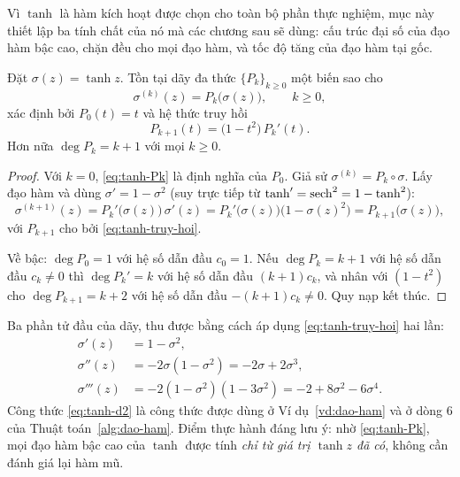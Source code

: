 Vì $\tanh$ là hàm kích hoạt được chọn cho toàn bộ phần thực nghiệm, mục này
thiết lập ba tính chất của nó mà các chương sau sẽ dùng: cấu trúc đại số của đạo
hàm bậc cao, chặn đều cho mọi đạo hàm, và tốc độ tăng của đạo hàm tại gốc.
 
\begin{bode}
\label{bd:tanh-dao-ham}
Đặt $\sigma(z) = \tanh z$. Tồn tại dãy đa thức $\{P_k\}_{k\ge 0}$ một biến sao
cho
\begin{equation}
\sigma^{(k)}(z) = P_k\big(\sigma(z)\big), \qquad k \ge 0,
\label{eq:tanh-Pk}
\end{equation}
xác định bởi $P_0(t) = t$ và hệ thức truy hồi
\begin{equation}
P_{k+1}(t) = \big(1 - t^2\big)\, P_k'(t).
\label{eq:tanh-truy-hoi}
\end{equation}
Hơn nữa $\deg P_k = k+1$ với mọi $k \ge 0$.
\end{bode}
 
\begin{proof}
Với $k = 0$, \eqref{eq:tanh-Pk} là định nghĩa của $P_0$. Giả sử
$\sigma^{(k)} = P_k \circ \sigma$. Lấy đạo hàm và dùng
$\sigma' = 1 - \sigma^2$ (suy trực tiếp từ
$\tanh' = \operatorname{sech}^2 = 1 - \tanh^2$):
\[
\sigma^{(k+1)}(z) = P_k'\big(\sigma(z)\big)\,\sigma'(z)
 = P_k'\big(\sigma(z)\big)\big(1 - \sigma(z)^2\big)
 = P_{k+1}\big(\sigma(z)\big),
\]
với $P_{k+1}$ cho bởi \eqref{eq:tanh-truy-hoi}.
 
Về bậc: $\deg P_0 = 1$ với hệ số dẫn đầu $c_0 = 1$. Nếu $\deg P_k = k+1$ với hệ
số dẫn đầu $c_k \ne 0$ thì $\deg P_k' = k$ với hệ số dẫn đầu $(k+1)c_k$, và nhân
với $(1-t^2)$ cho $\deg P_{k+1} = k+2$ với hệ số dẫn đầu $-(k+1)c_k \ne 0$. Quy
nạp kết thúc.
\end{proof}
 
Ba phần tử đầu của dãy, thu được bằng cách áp dụng
\eqref{eq:tanh-truy-hoi} hai lần:
\begin{align}
\sigma'(z)   &= 1 - \sigma^{2}, \label{eq:tanh-d1}\\
\sigma''(z)  &= -2\sigma\left(1-\sigma^{2}\right)
             = -2\sigma + 2\sigma^3, \label{eq:tanh-d2}\\
\sigma'''(z) &= -2\left(1-\sigma^{2}\right)\left(1-3\sigma^{2}\right)
             = -2 + 8\sigma^2 - 6\sigma^4. \label{eq:tanh-d3}
\end{align}
Công thức \eqref{eq:tanh-d2} là công thức được dùng ở Ví dụ~\ref{vd:dao-ham} và
ở dòng 6 của Thuật toán~\ref{alg:dao-ham}. Điểm thực hành đáng lưu ý: nhờ
\eqref{eq:tanh-Pk}, mọi đạo hàm bậc cao của $\tanh$ được tính \emph{chỉ từ giá
trị $\tanh z$ đã có}, không cần đánh giá lại hàm mũ.
 
